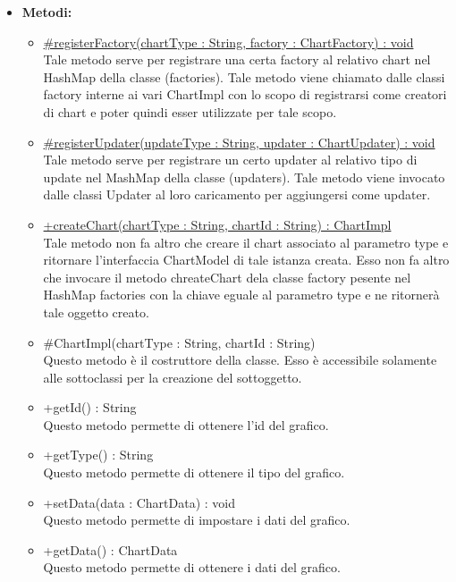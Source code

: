 \begin{itemize}
			\item \textbf{Metodi:}
				\begin{itemize}
				\setlength{\itemsep}{5pt}
				
					\item[\ding{111}] {\underline{\#registerFactory(chartType : String, factory : ChartFactory) : void}} \\ [1mm] Tale metodo serve per registrare una certa factory al relativo chart nel HashMap della classe (factories). Tale metodo viene chiamato dalle classi factory interne ai vari ChartImpl con lo scopo di registrarsi come creatori di chart e poter quindi esser utilizzate per tale scopo.
					\item[\ding{111}] {\underline{\#registerUpdater(updateType : String, updater : ChartUpdater) : void}} \\ [1mm] Tale metodo serve per registrare un certo updater al relativo tipo di update nel MashMap della classe (updaters). Tale metodo viene invocato dalle classi Updater al loro caricamento per aggiungersi come updater.
					\item[\ding{111}] {\underline{+createChart(chartType : String, chartId : String) : ChartImpl}} \\ [1mm] Tale metodo non fa altro che creare il chart associato al parametro type e ritornare l’interfaccia ChartModel di tale istanza creata. Esso non fa altro che invocare il metodo chreateChart dela classe factory pesente nel HashMap factories con la chiave eguale al parametro type e ne ritornerà tale oggetto creato.
					\item[\ding{111}] {{\#ChartImpl(chartType : String, chartId : String)}} \\ [1mm] Questo metodo è il costruttore della classe. Esso è accessibile solamente alle sottoclassi per la creazione del sottoggetto.
					\item[\ding{111}] {{+getId() : String}} \\ [1mm] Questo metodo permette di ottenere l'id del grafico.
					\item[\ding{111}] {{+getType() : String}} \\ [1mm] Questo metodo permette di ottenere il tipo del grafico.
					\item[\ding{111}] {{+setData(data : ChartData) : void}} \\ [1mm] Questo metodo permette di impostare i dati del grafico.
					\item[\ding{111}] {{+getData() : ChartData}} \\ [1mm] Questo metodo permette di ottenere i dati del grafico.

\end{itemize}
\end{itemize}
